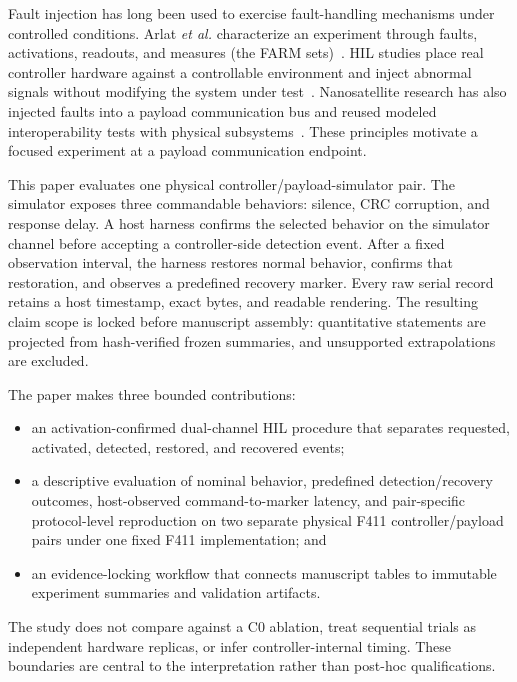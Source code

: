 \documentclass[conference]{IEEEtran}
\begin{document}
Fault injection has long been used to exercise fault-handling mechanisms under controlled conditions. Arlat \emph{et al.} characterize an experiment through faults, activations, readouts, and measures (the FARM sets)~\cite{arlat1990}. HIL studies place real controller hardware against a controllable environment and inject abnormal signals without modifying the system under test~\cite{abboush2022,abboush2024}. Nanosatellite research has also injected faults into a payload communication bus and reused modeled interoperability tests with physical subsystems~\cite{batista2019,conceicao2025}. These principles motivate a focused experiment at a payload communication endpoint.

This paper evaluates one physical controller/payload-simulator pair. The simulator exposes three commandable behaviors: silence, CRC corruption, and response delay. A host harness confirms the selected behavior on the simulator channel before accepting a controller-side detection event. After a fixed observation interval, the harness restores normal behavior, confirms that restoration, and observes a predefined recovery marker. Every raw serial record retains a host timestamp, exact bytes, and readable rendering. The resulting claim scope is locked before manuscript assembly: quantitative statements are projected from hash-verified frozen summaries, and unsupported extrapolations are excluded.

The paper makes three bounded contributions:

\begin{itemize}
  \item an activation-confirmed dual-channel HIL procedure that separates requested, activated, detected, restored, and recovered events;
  \item a descriptive evaluation of nominal behavior, predefined detection/recovery outcomes, host-observed command-to-marker latency, and pair-specific protocol-level reproduction on two separate physical F411 controller/payload pairs under one fixed F411 implementation; and
  \item an evidence-locking workflow that connects manuscript tables to immutable experiment summaries and validation artifacts.
\end{itemize}

The study does not compare against a C0 ablation, treat sequential trials as independent hardware replicas, or infer controller-internal timing. These boundaries are central to the interpretation rather than post-hoc qualifications.
\end{document}
